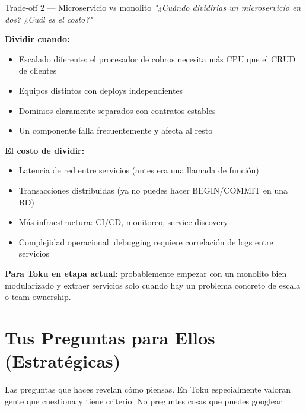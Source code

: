 \documentclass[11pt,a4paper]{article}
\begin{document}
\vspace{8pt}

\begin{preguntabox}{Trade-off 2 — Microservicio vs monolito}
\textit{"¿Cuándo dividirías un microservicio en dos? ¿Cuál es el costo?"}
\end{preguntabox}

\begin{respuestabox}
\textbf{Dividir cuando:}
\begin{itemize}[leftmargin=*]
  \item Escalado diferente: el procesador de cobros necesita más CPU que el CRUD de clientes
  \item Equipos distintos con deploys independientes
  \item Dominios claramente separados con contratos estables
  \item Un componente falla frecuentemente y afecta al resto
\end{itemize}

\textbf{El costo de dividir:}
\begin{itemize}[leftmargin=*]
  \item Latencia de red entre servicios (antes era una llamada de función)
  \item Transacciones distribuidas (ya no puedes hacer BEGIN/COMMIT en una BD)
  \item Más infraestructura: CI/CD, monitoreo, service discovery
  \item Complejidad operacional: debugging requiere correlación de logs entre servicios
\end{itemize}

\textbf{Para Toku en etapa actual}: probablemente empezar con un monolito bien modularizado
y extraer servicios solo cuando hay un problema concreto de escala o team ownership.
\end{respuestabox}

\section{Tus Preguntas para Ellos (Estratégicas)}

\begin{tcolorbox}[colback=simred!5,colframe=simred,title=\textbf{Por qué importa hacer buenas preguntas}]
Las preguntas que haces revelan cómo piensas. En Toku especialmente valoran gente
que cuestiona y tiene criterio. No preguntes cosas que puedes googlear.
\end{tcolorbox}
\end{document}
